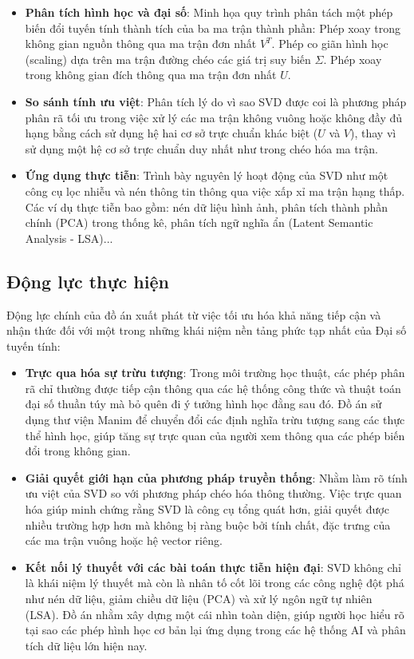\begin{itemize}[topsep=0pt, itemsep=2.5pt, leftmargin=1.5cm]
    \item \textbf{Phân tích hình học và đại số}: Minh họa quy trình phân tách một phép biến đổi tuyến tính thành tích của ba ma trận thành phần: Phép xoay trong không gian nguồn thông qua ma trận đơn nhất $V^T$. Phép co giãn hình học (scaling) dựa trên ma trận đường chéo các giá trị suy biến $\Sigma$. Phép xoay trong không gian đích thông qua ma trận đơn nhất $U$.
    \item \textbf{So sánh tính ưu việt}: Phân tích lý do vì sao SVD được coi là phương pháp phân rã tối ưu trong việc xử lý các ma trận không vuông hoặc không đầy đủ hạng bằng cách sử dụng hệ hai cơ sở trực chuẩn khác biệt ($U$ và $V$), thay vì sử dụng một hệ cơ sở trực chuẩn duy nhất như trong chéo hóa ma trận.
    \item \textbf{Ứng dụng thực tiễn}: Trình bày nguyên lý hoạt động của SVD như một công cụ lọc nhiễu và nén thông tin thông qua việc xấp xỉ ma trận hạng thấp. Các ví dụ thực tiễn bao gồm: nén dữ liệu hình ảnh, phân tích thành phần chính (PCA) trong thống kê, phân tích ngữ nghĩa ẩn (Latent Semantic Analysis - LSA)...
\end{itemize}

\subsection{Động lực thực hiện}

Động lực chính của đồ án xuất phát từ việc tối ưu hóa khả năng tiếp cận và nhận thức đối với một trong những khái niệm nền tảng phức tạp nhất của Đại số tuyến tính:

\begin{itemize}[topsep=0pt, itemsep=2.5pt, leftmargin=1.5cm]
    \item \textbf{Trực qua hóa sự trừu tượng}: Trong môi trường học thuật, các phép phân rã chỉ thường được tiếp cận thông qua các hệ thống công thức và thuật toán đại số thuần túy mà bỏ quên đi ý tưởng hình học đằng sau đó. Đồ án sử dụng thư viện Manim để chuyển đổi các định nghĩa trừu tượng sang các thực thể hình học, giúp tăng sự trực quan của người xem thông qua các phép biến đổi trong không gian.
    \newpage
    \item \textbf{Giải quyết giới hạn của phương pháp truyền thống}: Nhằm làm rõ tính ưu việt của SVD so với phương pháp chéo hóa thông thường. Việc trực quan hóa giúp minh chứng rằng SVD là công cụ tổng quát hơn, giải quyết được nhiều trường hợp hơn mà không bị ràng buộc bởi tính chất, đặc trưng của các ma trận vuông hoặc hệ vector riêng.
    \item \textbf{Kết nối lý thuyết với các bài toán thực tiễn hiện đại}: SVD không chỉ là khái niệm lý thuyết mà còn là nhân tố cốt lõi trong các công nghệ đột phá như nén dữ liệu, giảm chiều dữ liệu (PCA) và xử lý ngôn ngữ tự nhiên (LSA). Đồ án nhằm xây dựng một cái nhìn toàn diện, giúp người học hiểu rõ tại sao các phép hình học cơ bản lại ứng dụng trong các hệ thống AI và phân tích dữ liệu lớn hiện nay.
\end{itemize}

